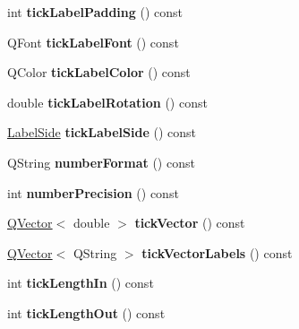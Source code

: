 \begin{DoxyCompactItemize}
int {\bfseries tick\+Label\+Padding} () const
\item 
\mbox{\label{class_q_c_p_axis_a09f339b7125cf1094920f86687b88236}} 
Q\+Font {\bfseries tick\+Label\+Font} () const
\item 
\mbox{\label{class_q_c_p_axis_a9e21b2326bb2de0b7a8efcd1efc0ce78}} 
Q\+Color {\bfseries tick\+Label\+Color} () const
\item 
\mbox{\label{class_q_c_p_axis_a5c81e5d550266fdb9e11d96d1dc5713e}} 
double {\bfseries tick\+Label\+Rotation} () const
\item 
\mbox{\label{class_q_c_p_axis_a1dc21783965a7c7d9c29c2a75d0a54e1}} 
\hyperlink{class_q_c_p_axis_a24b13374b9b8f75f47eed2ea78c37db9}{Label\+Side} {\bfseries tick\+Label\+Side} () const
\item 
\mbox{\label{class_q_c_p_axis_a20cc29c2f282a0e9efd8f32145e47be6}} 
Q\+String {\bfseries number\+Format} () const
\item 
\mbox{\label{class_q_c_p_axis_a2562b6f3a4a01c7ed83a388042664998}} 
int {\bfseries number\+Precision} () const
\item 
\mbox{\label{class_q_c_p_axis_a5aad9d6b34821ab0751dfc38dbc92a46}} 
\hyperlink{class_q_vector}{Q\+Vector}$<$ double $>$ {\bfseries tick\+Vector} () const
\item 
\mbox{\label{class_q_c_p_axis_a1bd4a9036e0c9fc68b6f3df81f07e55f}} 
\hyperlink{class_q_vector}{Q\+Vector}$<$ Q\+String $>$ {\bfseries tick\+Vector\+Labels} () const
\item 
\mbox{\label{class_q_c_p_axis_ace2accb350fd3f3f474280f58c1d61c5}} 
int {\bfseries tick\+Length\+In} () const
\item 
\mbox{\label{class_q_c_p_axis_ad3ba6614ccddf351f133e0acdd4f021e}} 
int {\bfseries tick\+Length\+Out} () const
\item 
\mbox{\label{class_q_c_p_axis_ad74153c38fd83b54c509cff249370beb}} 

\end{DoxyCompactItemize}
